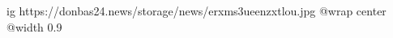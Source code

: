  
 
 
 
 

\ifcmt
  ig https://donbas24.news/storage/news/erxms3ueenzxtlou.jpg
  @wrap center
  @width 0.9
\fi
